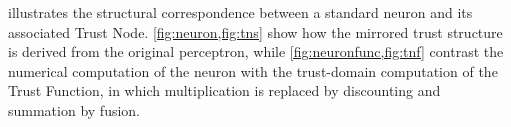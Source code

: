     

 illustrates the structural correspondence between a standard neuron and its associated Trust Node. \cref{fig:neuron,fig:tns} show how the mirrored trust structure is derived from the original perceptron, while \cref{fig:neuronfunc,fig:tnf} contrast the numerical computation of the neuron with the trust-domain computation of the Trust Function, in which multiplication is replaced by discounting and summation by fusion. 

    
    
